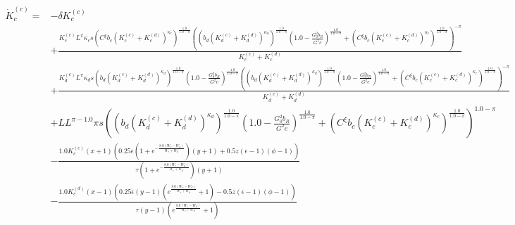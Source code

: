   \begin{align*}
    \dot{K}_c^{(c)}=& - \delta K^{(c)}_{c} \\
&+ \frac{K^{(c)}_{c} L^{\pi} \kappa_{c} s \left(C^{\xi} b_{c} \left(K^{(c)}_{c} + K^{(d)}_{c}\right)^{\kappa_{c}}\right)^{\frac{1.0}{1.0 - \pi}} \left(\left(b_{d} \left(K^{(c)}_{d} + K^{(d)}_{d}\right)^{\kappa_{d}}\right)^{\frac{1.0}{1.0 - \pi}} \left(1.0 - \frac{G_{0}^{2} b_{R}}{G^{2} e}\right)^{\frac{1.0}{1.0 - \pi}} + \left(C^{\xi} b_{c} \left(K^{(c)}_{c} + K^{(d)}_{c}\right)^{\kappa_{c}}\right)^{\frac{1.0}{1.0 - \pi}}\right)^{- \pi}}{K^{(c)}_{c} + K^{(d)}_{c}} \\
&+ \frac{K^{(c)}_{d} L^{\pi} \kappa_{d} s \left(b_{d} \left(K^{(c)}_{d} + K^{(d)}_{d}\right)^{\kappa_{d}}\right)^{\frac{1.0}{1.0 - \pi}} \left(1.0 - \frac{G_{0}^{2} b_{R}}{G^{2} e}\right)^{\frac{1.0}{1.0 - \pi}} \left(\left(b_{d} \left(K^{(c)}_{d} + K^{(d)}_{d}\right)^{\kappa_{d}}\right)^{\frac{1.0}{1.0 - \pi}} \left(1.0 - \frac{G_{0}^{2} b_{R}}{G^{2} e}\right)^{\frac{1.0}{1.0 - \pi}} + \left(C^{\xi} b_{c} \left(K^{(c)}_{c} + K^{(d)}_{c}\right)^{\kappa_{c}}\right)^{\frac{1.0}{1.0 - \pi}}\right)^{- \pi}}{K^{(c)}_{d} + K^{(d)}_{d}} \\
&+ L L^{\pi - 1.0} \pi s \left(\left(b_{d} \left(K^{(c)}_{d} + K^{(d)}_{d}\right)^{\kappa_{d}}\right)^{\frac{1.0}{1.0 - \pi}} \left(1.0 - \frac{G_{0}^{2} b_{R}}{G^{2} e}\right)^{\frac{1.0}{1.0 - \pi}} + \left(C^{\xi} b_{c} \left(K^{(c)}_{c} + K^{(d)}_{c}\right)^{\kappa_{c}}\right)^{\frac{1.0}{1.0 - \pi}}\right)^{1.0 - \pi} \\
&- \frac{1.0 K^{(c)}_{c} \left(x + 1\right) \left(0.25 \epsilon \left(1 + e^{- \frac{8.0 \left(W_{c} - W_{d}\right)}{W_{c} + W_{d}}}\right) \left(y + 1\right) + 0.5 z \left(\epsilon - 1\right) \left(\phi - 1\right)\right)}{\tau \left(1 + e^{- \frac{8.0 \left(W_{c} - W_{d}\right)}{W_{c} + W_{d}}}\right) \left(y + 1\right)} \\
&- \frac{1.0 K^{(d)}_{c} \left(x - 1\right) \left(0.25 \epsilon \left(y - 1\right) \left(e^{\frac{8.0 \left(W_{c} - W_{d}\right)}{W_{c} + W_{d}}} + 1\right) - 0.5 z \left(\epsilon - 1\right) \left(\phi - 1\right)\right)}{\tau \left(y - 1\right) \left(e^{\frac{8.0 \left(W_{c} - W_{d}\right)}{W_{c} + W_{d}}} + 1\right)}
%
\end{align*}
